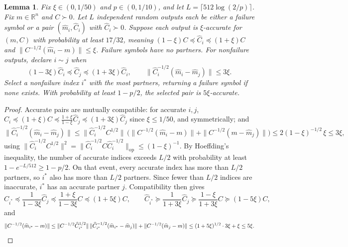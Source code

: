 \documentclass[11pt]{article}
\numberwithin{equation}{section}
\newtheorem{lemma}{Lemma}[section]
\theoremstyle{definition}
\newcommand{\R}{\mathbb{R}}
\newcommand{\op}{\mathrm{op}}
\begin{document}
\begin{lemma}
\label{lem:selection}
Fix $\xi\in(0,1/50)$ and
$p\in(0,1/10)$, and let
$L=\lceil512\log(2/p)\rceil$.
Fix $m\in\R^n$ and $C\succ0$.
Let $L$ independent random outputs each be either a failure symbol or a pair
$(\widehat m_i,\widehat C_i)$ with $\widehat C_i\succ0$.
Suppose each output is \emph{$\xi$-accurate} for $(m,C)$ with probability
at least $17/32$, meaning
$(1-\xi)C\preceq\widehat C_i\preceq(1+\xi)C$ and
$\|C^{-1/2}(\widehat m_i-m)\|\leq\xi$.
Failure symbols have no partners. For nonfailure outputs, declare $i\sim j$ when
\[
(1-3\xi)\widehat C_i
\preceq\widehat C_j
\preceq(1+3\xi)\widehat C_i,
\qquad
\|\widehat C_i^{-1/2}(\widehat m_i-\widehat m_j)\|\leq3\xi .
\]
Select a nonfailure index $i^*$ with the most partners, returning a failure
symbol if none exists. With probability at least $1-p/2$, the selected pair
is $5\xi$-accurate.
\end{lemma}

\begin{proof}
Accurate pairs are mutually compatible: for accurate $i,j$,
$\widehat C_i\preceq(1+\xi)C\preceq\frac{1+\xi}{1-\xi}\widehat C_j \preceq(1+3\xi)\widehat C_j$
since
$\xi\leq1/50$, and symmetrically; and
\[
\|\widehat C_i^{-1/2}(\widehat m_i-\widehat m_j)\|
\leq\|\widehat C_i^{-1/2}C^{1/2}\|\, \bigl(\|C^{-1/2}(\widehat m_i-m)\| +\|C^{-1/2}(m-\widehat m_j)\|\bigr)
\leq2(1-\xi)^{-1/2}\,\xi
\leq3\xi ,
\]
using
$\|\widehat C_i^{-1/2}C^{1/2}\|^2 =\|\widehat C_i^{-1/2}C\widehat C_i^{-1/2}\|_{\op}\leq(1-\xi)^{-1}$.
By Hoeffding's inequality, the number of accurate indices exceeds $L/2$
with probability at least
$1-e^{-L/512}\geq1-p/2$.
On that event, every accurate index has more than $L/2$ partners,
so $i^*$ also has more than $L/2$ partners.
Since fewer than $L/2$ indices are inaccurate,
$i^*$ has an accurate partner $j$.
Compatibility then gives
\[
\widehat C_{i^*}
\preceq\frac1{1-3\xi}\widehat C_j
\preceq\frac{1+\xi}{1-3\xi}C
\preceq(1+5\xi)C,
\qquad
\widehat C_{i^*}
\succeq\frac1{1+3\xi}\widehat C_j
\succeq\frac{1-\xi}{1+3\xi}C
\succeq(1-5\xi)C,
\]
and
\[
\|C^{-1/2}(\widehat m_{i^*}-m)\|
\leq\|C^{-1/2}\widehat C_{i^*}^{1/2}\|\, \|\widehat C_{i^*}^{-1/2}(\widehat m_{i^*}-\widehat m_j)\| +\|C^{-1/2}(\widehat m_j-m)\|
\leq(1+5\xi)^{1/2}\cdot3\xi+\xi
\leq5\xi .\qedhere
\]
\end{proof}
\end{document}
